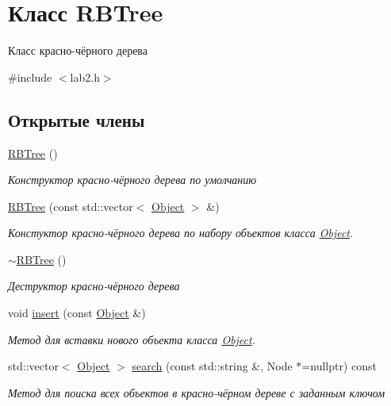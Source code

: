 \hypertarget{classRBTree}{}\section{Класс R\+B\+Tree}
\label{classRBTree}


Класс красно-\/чёрного дерева  




{\ttfamily \#include $<$lab2.\+h$>$}

\subsection*{Открытые члены}
\begin{DoxyCompactItemize}
\item 
\mbox{\label{classRBTree_a19921f34f32f777bb3c4b85d4ff1d9de}} 
\mbox{\hyperlink{classRBTree_a19921f34f32f777bb3c4b85d4ff1d9de}{R\+B\+Tree}} ()
\begin{DoxyCompactList}\small\item\em Конструктор красно-\/чёрного дерева по умолчанию \end{DoxyCompactList}\item 
\mbox{\hyperlink{classRBTree_afdab010948bf322d42bd33127b5a1b58}{R\+B\+Tree}} (const std\+::vector$<$ \mbox{\hyperlink{structObject}{Object}} $>$ \&)
\begin{DoxyCompactList}\small\item\em Констуктор красно-\/чёрного дерева по набору объектов класса \mbox{\hyperlink{structObject}{Object}}. \end{DoxyCompactList}\item 
\mbox{\label{classRBTree_abab51e54e07c1adf0ca0c9a5d466427b}} 
\mbox{\hyperlink{classRBTree_abab51e54e07c1adf0ca0c9a5d466427b}{$\sim$\+R\+B\+Tree}} ()
\begin{DoxyCompactList}\small\item\em Деструктор красно-\/чёрного дерева \end{DoxyCompactList}\item 
void \mbox{\hyperlink{classRBTree_acb80f239f846884ed1a7ca2c0d2515bb}{insert}} (const \mbox{\hyperlink{structObject}{Object}} \&)
\begin{DoxyCompactList}\small\item\em Метод для вставки нового объекта класса \mbox{\hyperlink{structObject}{Object}}. \end{DoxyCompactList}\item 
std\+::vector$<$ \mbox{\hyperlink{structObject}{Object}} $>$ \mbox{\hyperlink{classRBTree_a1afdf2af49051499c00452aa01107255}{search}} (const std\+::string \&, Node $\ast$=nullptr) const
\begin{DoxyCompactList}\small\item\em Метод для поиска всех объектов в красно-\/чёрном дереве с заданным ключом \end{DoxyCompactList}\end{DoxyCompactItemize}


